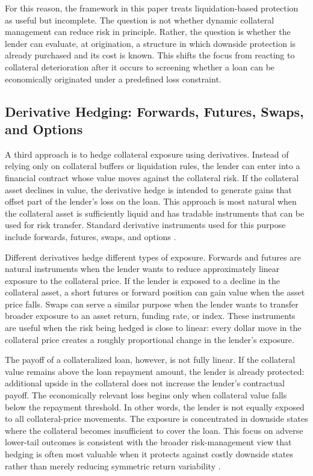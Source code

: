 \documentclass[11pt]{article}
\begin{document}
For this reason, the framework in this paper treats liquidation-based protection as useful but incomplete. The question is not whether dynamic collateral management can reduce risk in principle. Rather, the question is whether the lender can evaluate, at origination, a structure in which downside protection is already purchased and its cost is known. This shifts the focus from reacting to collateral deterioration after it occurs to screening whether a loan can be economically originated under a predefined loss constraint.

\subsection{Derivative Hedging: Forwards, Futures, Swaps, and Options}

A third approach is to hedge collateral exposure using derivatives. Instead of relying only on collateral buffers or liquidation rules, the lender can enter into a financial contract whose value moves against the collateral risk. If the collateral asset declines in value, the derivative hedge is intended to generate gains that offset part of the lender’s loss on the loan. This approach is most natural when the collateral asset is sufficiently liquid and has tradable instruments that can be used for risk transfer. Standard derivative instruments used for this purpose include forwards, futures, swaps, and options \citep{hull_2022_derivatives}.

Different derivatives hedge different types of exposure. Forwards and futures are natural instruments when the lender wants to reduce approximately linear exposure to the collateral price. If the lender is exposed to a decline in the collateral asset, a short futures or forward position can gain value when the asset price falls. Swaps can serve a similar purpose when the lender wants to transfer broader exposure to an asset return, funding rate, or index. These instruments are useful when the risk being hedged is close to linear: every dollar move in the collateral price creates a roughly proportional change in the lender’s exposure.

The payoff of a collateralized loan, however, is not fully linear. If the collateral value remains above the loan repayment amount, the lender is already protected: additional upside in the collateral does not increase the lender’s contractual payoff. The economically relevant loss begins only when collateral value falls below the repayment threshold. In other words, the lender is not equally exposed to all collateral-price movements. The exposure is concentrated in downside states where the collateral becomes insufficient to cover the loan. This focus on adverse lower-tail outcomes is consistent with the broader risk-management view that hedging is often most valuable when it protects against costly downside states rather than merely reducing symmetric return variability \citep{stulz_1996_risk_management}.
\end{document}
